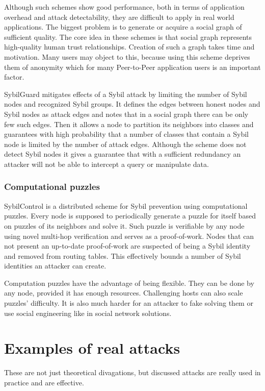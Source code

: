   Although such schemes show good performance, both in terms of application
  overhead and attack detectability, they are difficult to apply in real world
  applications. The biggest problem is to generate or acquire a social graph of
  sufficient quality. The core idea in these schemes is that social graph
  represents high-quality human trust relationships. Creation of such a graph
  takes time and motivation. Many users may object to this, because using this
  scheme deprives them of anonymity which for many Peer-to-Peer application
  users is an important factor.

  SybilGuard \cite{hai06} mitigates effects of a Sybil attack by limiting the
  number of Sybil nodes and recognized Sybil groups. It defines the edges
  between honest nodes and Sybil nodes as attack edges and notes that in a
  social graph there can be only few such edges. Then it allows a node to
  partition its neighbors into classes and guarantees with high probability
  that a number of classes that contain a Sybil node is limited by the number of
  attack edges. Although the scheme does not detect Sybil nodes it gives a
  guarantee that with a sufficient redundancy an attacker will not be able to
  intercept a query or manipulate data.

  \subsubsection{Computational puzzles}
  SybilControl\cite{li12} is a distributed scheme for Sybil prevention using
  computational puzzles. Every node is supposed to periodically generate a
  puzzle for itself based on puzzles of its neighbors and solve it. Such puzzle
  is verifiable by any node using novel multi-hop verification and serves as a
  proof-of-work. Nodes that can not present an up-to-date proof-of-work are
  suspected of being a Sybil identity and removed from routing tables. This
  effectively bounds a number of Sybil identities an attacker can create.

  Computation puzzles have the advantage of being flexible. They can be done by
  any node, provided it has enough resources. Challenging hosts can also scale
  puzzles' difficulty. It is also much harder for an attacker to fake
  solving them or use social engineering like in social network solutions.

\section{Examples of real attacks}
These are not just theoretical divagations, but discussed attacks are really
used in practice and are effective.

